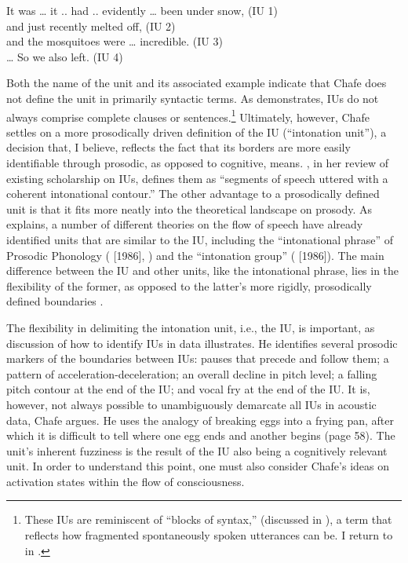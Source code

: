 \ea%
    \label{ex:6:1}
It was … it .. had .. evidently … been under snow, \hfill (IU 1)\\
and just recently melted off,                      \hfill (IU 2)\\
and the mosquitoes were … incredible.              \hfill (IU 3) \\
… So we also left.                                 \hfill (IU 4)
  \z

\noindent Both the name of the unit and its associated example indicate that Chafe does not define the unit in primarily syntactic terms. As  demonstrates, IUs do not always comprise complete clauses or sentences.\footnote{{These IUs are reminiscent of  “blocks of syntax,” (discussed in ), a term that reflects how fragmented spontaneously spoken utterances can be. I return to \citet{MillerWeinert1998} in .} } Ultimately, however, Chafe settles on a more prosodically driven definition of the IU (“intonation unit”), a decision that, I believe, reflects the fact that its borders are more easily identifiable through prosodic, as opposed to cognitive, means. \citet[15--17]{Simpson2016}, in her review of existing scholarship on IUs, defines them as “segments of speech uttered with a coherent intonational contour.” The other advantage to a prosodically defined unit is that it fits more neatly into the theoretical landscape on prosody. As \citet[17]{Simpson2016} explains, a number of different theories on the flow of speech have already identified units that are similar to the IU, including the “intonational phrase” of Prosodic Phonology (\citealt{NesporVogel2007} [1986], \citealt{Selkirk1984}) and the “intonation group” (\citealt{Cruttenden1997} [1986]). The main difference between the IU and other units, like the intonational phrase, lies in the flexibility of the former, as opposed to the latter’s more rigidly, prosodically defined boundaries \citep[17]{Simpson2016}.

The flexibility in delimiting the intonation unit, i.e., the IU, is important, as  discussion of how to identify IUs in data illustrates. He identifies several prosodic markers of the boundaries between IUs: pauses that precede and follow them; a pattern of acceleration-deceleration; an overall decline in pitch level; a falling pitch contour at the end of the IU; and vocal fry at the end of the IU. It is, however, not always possible to unambiguously demarcate all IUs in acoustic data, Chafe argues. He uses the analogy of breaking eggs into a frying pan, after which it is difficult to tell where one egg ends and another begins (page 58). The unit’s inherent fuzziness is the result of the IU also being a cognitively relevant unit. In order to understand this point, one must also consider Chafe’s ideas on activation states within the flow of consciousness.

